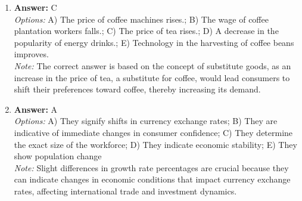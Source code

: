 \documentclass[12pt]{article}
\begin{document}
\begin{enumerate}[label=\arabic*.]
\item \textbf{Answer:} C
\\ \textit{Options:} A) The price of coffee machines rises.; B) The wage of coffee plantation workers falls.; C) The price of tea rises.; D) A decrease in the popularity of energy drinks.; E) Technology in the harvesting of coffee beans improves.
\\ \textit{Note:} The correct answer is based on the concept of substitute goods, as an increase in the price of tea, a substitute for coffee, would lead consumers to shift their preferences toward coffee, thereby increasing its demand.
\item \textbf{Answer:} A
\\ \textit{Options:} A) They signify shifts in currency exchange rates; B) They are indicative of immediate changes in consumer confidence; C) They determine the exact size of the workforce; D) They indicate economic stability; E) They show population change
\\ \textit{Note:} Slight differences in growth rate percentages are crucial because they can indicate changes in economic conditions that impact currency exchange rates, affecting international trade and investment dynamics.
\end{enumerate}
\end{document}
